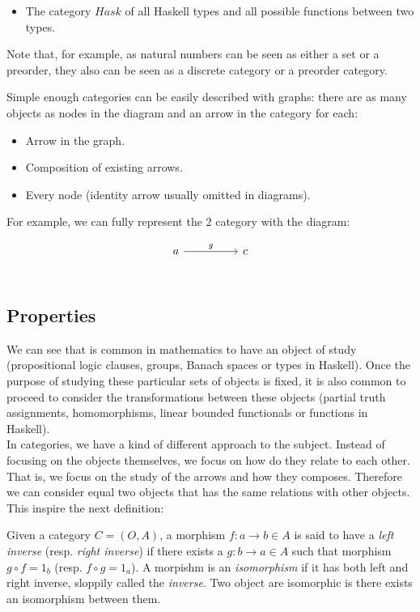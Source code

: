 \begin{example}
\begin{itemize}
  \item The category $Hask$ of all Haskell types and all possible functions between two types.\\
    
  \end{itemize}
  Note that, for example, as natural numbers can be seen as either a set or a preorder, they also can be seen as a discrete category or a preorder category.
\end{example}


Simple enough categories can be easily described with graphs: there are as many objects as nodes in the diagram and an arrow in the category for each:
\begin{itemize}
\item Arrow in the graph. 
\item Composition of existing arrows.
\item Every node (identity arrow usually omitted in diagrams).
\end{itemize}

For example, we can fully represent the $2$ category with the diagram:

\[
  \begin{tikzcd}
    a\arrow[rr, "g"] && c\\
  \end{tikzcd}
\]




\subsection{Properties}

We can see that is common in mathematics to have an object of study (propositional logic clauses, groups, Banach spaces or types in Haskell). Once the purpose of studying these particular sets of objects is fixed, it is also common to proceed to consider the transformations between these objects (partial truth assignments, homomorphisms, linear bounded functionals or  functions in Haskell).\\

In categories, we have a kind of different approach to the subject. Instead of focusing on the objects themselves, we focus on how do they relate to each other. That is, we focus on the study of the arrows and how they composes. Therefore we can consider equal two objects that has the same relations with other objects. This inspire the next definition:

\begin{definition}\cite[Definition 1.1.9]{riehl2017category}
  Given a category $C=(O,A)$, a morphism $f: a \to b \in A$ is said to have a \emph{left inverse} (resp. \emph{right inverse}) if there exists a $g: b \to a \in A$ such that morphism $g \circ f = 1_b$ (resp. $f \circ g = 1_a$). A morpishm is an \emph{isomorphism} if it has both left and right inverse, sloppily called the \emph{inverse}. Two object are isomorphic is there exists an isomorphism between them.
\end{definition}



